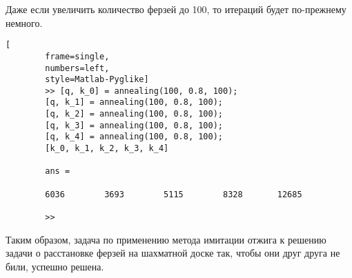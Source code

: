 \documentclass[../main.tex]{subfiles}
\begin{document}
	Даже если увеличить количество ферзей до 100, то итераций будет по-прежнему немного.
	
	
		\begin{lstlisting}[
		frame=single,
		numbers=left,
		style=Matlab-Pyglike]
		>> [q, k_0] = annealing(100, 0.8, 100);
		[q, k_1] = annealing(100, 0.8, 100);
		[q, k_2] = annealing(100, 0.8, 100);
		[q, k_3] = annealing(100, 0.8, 100);
		[q, k_4] = annealing(100, 0.8, 100);
		[k_0, k_1, k_2, k_3, k_4]
		
		ans =
		
		6036        3693        5115        8328       12685
		
		>>  
	\end{lstlisting} 
	
	Таким образом, задача по применению метода имитации отжига к решению задачи о расстановке ферзей на шахматной доске так, чтобы они друг друга не били, успешно решена.
	
	
\end{document}
